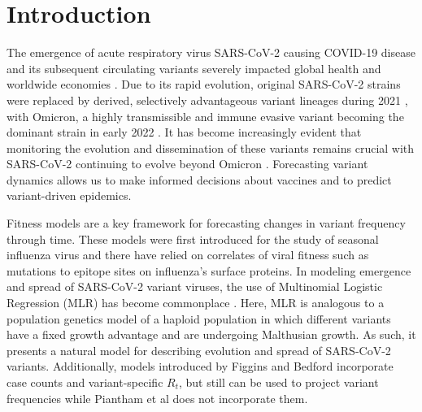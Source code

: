 \documentclass[10pt,letterpaper]{article}
\begin{document}
\linenumbers

\section*{Introduction}
The emergence of acute respiratory virus SARS-CoV-2 causing COVID-19 disease and its subsequent circulating variants severely impacted global health and worldwide economies \cite{onyeaka2021covid19}.
Due to its rapid evolution, original SARS-CoV-2 strains were replaced by derived, selectively advantageous variant lineages during 2021 \cite{campbell2021increased}, with Omicron, a highly transmissible and immune evasive variant becoming the dominant strain in early 2022 \cite{viana2022rapid}.
It has become increasingly evident that monitoring the evolution and dissemination of these variants remains crucial with SARS-CoV-2 continuing to evolve beyond Omicron \cite{carabelli2023sarscov2}.
Forecasting variant dynamics allows us to make informed decisions about vaccines and to predict variant-driven epidemics.

Fitness models are a key framework for forecasting changes in variant frequency through time.
These models were first introduced for the study of seasonal influenza virus \cite{luksza2014predictive, morris2018predictive, huddleston2020integrating} and there have relied on correlates of viral fitness such as mutations to epitope sites on influenza's surface proteins.
In modeling emergence and spread of SARS-CoV-2 variant viruses, the use of Multinomial Logistic Regression (MLR) has become commonplace \cite{annavajhala2021emergence, faria2021genomics, obermeyer2022analysis, susswein2023early}.
Here, MLR is analogous to a population genetics model of a haploid population in which different variants have a fixed growth advantage and are undergoing Malthusian growth.
As such, it presents a natural model for describing evolution and spread of SARS-CoV-2 variants.
Additionally, models introduced by Figgins and Bedford \cite{figgins2022sars} incorporate case counts and variant-specific $R_t$, but still can be used to project variant frequencies while Piantham et al \cite{piantham2021estimating} does not incorporate them.
\end{document}
